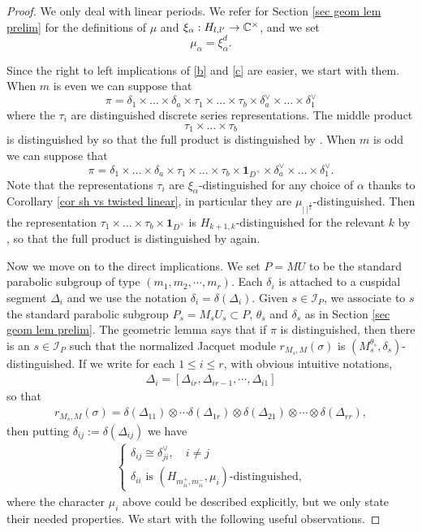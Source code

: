 \documentclass[11pt,letterpaper]{amsart}
\newcommand{\CI}{{\mathcal {I}}} \newcommand{\CJ}{{\mathcal {J}}}\newcommand{\CK}{{\mathcal {K}}}\newcommand{\CL}{{\mathcal {L}}}
\newcommand{\triv}{{\mathbf{1}}}
\def\D{\Delta}
\def\d{\delta}
\theoremstyle{plain}
\numberwithin{equation}{section}
\begin{document}
\begin{proof}
We only deal with linear periods. We refer for Section \ref{sec geom lem prelim} for the definitions of 
$\mu$ and $\xi_{\alpha}:H_{l,l'}\to {\mathbb {C}}^\times$, and we set \[\mu_{\alpha}=\xi_{\alpha}^d.\]

Since the right to left implications of \eqref{b} and \eqref{c} are easier, we start with them. When $m$ is even we can suppose that 
\[\pi=\d_1\times \dots \times \d_a \times  \tau_1 \times \dots \times \tau_b \times  \d_a^\vee \times \dots \times \d_1^\vee\] where the $\tau_i$ are distinguished discrete series representations. The middle product \[\tau_1 \times \dots \times \tau_b\] is distinguished by \cite[Proposition 3.8]{MatCRELLE} so that the full product is distinguished by \cite[Proposition 7.2]{OJNT}. When $m$ is odd we can suppose that 
\[\pi=\d_1\times \dots \times \d_a \times  \tau_1 \times \dots \times \tau_b \times \triv_{D^\times} \times  \d_a^\vee \times \dots \times \d_1^\vee.\] Note that the representations $\tau_i$ are $\xi_{\alpha}$-distinguished for any choice of $\alpha$ thanks to Corollary \ref{cor sh vs twisted linear}, in particular they are $\mu_{|\ |^{\frac{1}{2}}}$-distinguished. Then the representation $ \tau_1 \times \dots \times \tau_b  \times \triv_{D^\times}$ is $H_{k+1,k}$-distinguished for the relevant $k$ by \cite[Proposition 3.8]{MatCRELLE}, so that the full product is distinguished by \cite[Proposition 7.2]{OJNT} again.

Now we move on to the direct implications. We set $P = MU$ to be the standard parabolic subgroup of type $(m_1,m_2,\cdots,m_r)$. Each $\d_i$ is attached to a cuspidal segment $\D_i$ and we use the notation $\d_i=\d(\D_i)$. Given $s \in \CI_P$, we associate to $s$ the standard parabolic subgroup $P_s = M_sU_s \subset P$, $\theta_s$ and $\delta_s$ as in Section \ref{sec geom lem prelim}. The geometric lemma says that if $\pi$ is distinguished, then there is an $s \in \CI_P$ such that the normalized Jacquet module $r_{M_s,M} (\sigma) $ is $(M_s^{\theta_s}, \delta_s)$-distinguished. If we write for each $1 \leqslant i \leqslant r$, with obvious intuitive notations, 
\begin{align*}
	\D_i = [\D_{i r},\D_{i r-1} ,\cdots,\D_{i 1}]
\end{align*}
so that
\begin{align*}
	r_{M_s,M}(\sigma)  = \d(\D_{1 1}) \otimes \cdots \d(\D_{1 r}) \otimes \d(\D_{2 1}) \otimes \cdots \otimes \d(\D_{r r}),
\end{align*}
then putting $\d_{i j}:=\d(\D_{i j})$ we have
\begin{align}\label{eq::geom-lemma}
	\begin{cases*}
		\d_{i j} \cong \d_{j i}^{\vee},\quad i \neq j \\
		\d_{i i} \text{ is }(H_{m_{i i}^+,m_{i i}^-},\mu_i) \text{-distinguished,}
	\end{cases*}
\end{align}
where the character $\mu_i$ above could be described explicitly, but we only state their needed properties. We start with the following useful observations.


\end{proof}
\end{document}
